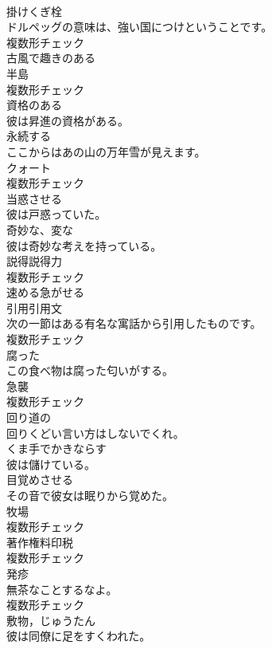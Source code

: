 \documentclass[8pt]{extreport}
\begin{document}
\begin{CJK}{UTF8}{min}
\\	[名詞]	掛けくぎ栓	
\\	ドルペッグの意味は、強い国につけということです。	
\\	複数形チェック
\\	[形容詞]	古風で趣きのある	
\\	[名詞]	半島	
\\	複数形チェック
\\	[形容詞]	資格のある	
\\	彼は昇進の資格がある。	
\\	[形容詞]	永続する	
\\	ここからはあの山の万年雪が見えます。	
\\	[名詞]	クォート	
\\	複数形チェック
\\	[動詞]	当惑させる	
\\	彼は戸惑っていた。	
\\	[形容詞]	奇妙な、変な	
\\	彼は奇妙な考えを持っている。	
\\	[名詞]	説得説得力	
\\	複数形チェック
\\	[動詞]	速める急がせる	
\\	[名詞]	引用引用文	
\\	次の一節はある有名な寓話から引用したものです。	
\\	複数形チェック
\\	[形容詞]	腐った	
\\	この食べ物は腐った匂いがする。	
\\	[名詞]	急襲	
\\	複数形チェック
\\	[形容詞]	回り道の	
\\	回りくどい言い方はしないでくれ。	
\\	[動詞]	くま手でかきならす	
\\	彼は儲けている。	
\\	[動詞]	目覚めさせる	
\\	その音で彼女は眠りから覚めた。	
\\	[名詞]	牧場	
\\	複数形チェック
\\	[名詞]	著作権料印税	
\\	複数形チェック
\\	[名詞]	発疹	
\\	無茶なことするなよ。	
\\	複数形チェック
\\	[名詞]	敷物，じゅうたん	
\\	彼は同僚に足をすくわれた。	

\end{CJK}
\end{document}
